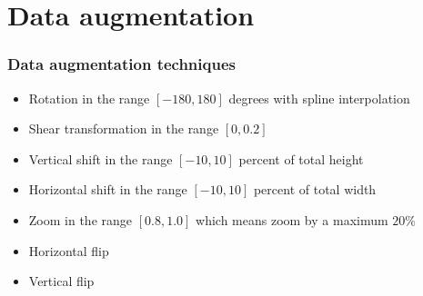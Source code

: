 \documentclass{beamer}
\begin{document}
%
%

\section{Data augmentation}
\begin{frame}
\frametitle{Data augmentation techniques}

\begin{itemize}
\item<1-> Rotation in the range $[-180, 180]$ degrees with spline interpolation
\item<2-> Shear transformation in the range $[0, 0.2]$
\item<3-> Vertical shift in the range $[-10, 10]$ percent of total height
\item<4-> Horizontal shift in the range $[-10, 10]$ percent of total width
\item<5-> Zoom in the range $[0.8, 1.0]$ which means zoom by a maximum $20\%$
\item<6-> Horizontal flip
\item<7-> Vertical flip
\end{itemize}

\end{frame}
\end{document}
